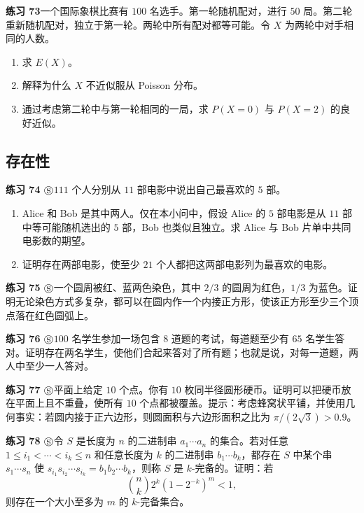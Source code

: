\documentclass[UTF8, 12pt, fontset=fandol, oneside]{ctexart}
\begin{document}
\noindent\textbf{练习 73}\quad 一个国际象棋比赛有 $100$ 名选手。第一轮随机配对，进行 $50$ 局。第二轮重新随机配对，独立于第一轮。两轮中所有配对都等可能。令 $X$ 为两轮中对手相同的人数。
\begin{enumerate}
  \item[(a)] 求 $E(X)$。
  \item[(b)] 解释为什么 $X$ 不近似服从 Poisson 分布。
  \item[(c)] 通过考虑第二轮中与第一轮相同的一局，求 $P(X=0)$ 与 $P(X=2)$ 的良好近似。
\end{enumerate}

\subsection*{存在性}

\noindent\textbf{练习 74 $\circledS$}\quad $111$ 个人分别从 $11$ 部电影中说出自己最喜欢的 $5$ 部。
\begin{enumerate}
  \item[(a)] Alice 和 Bob 是其中两人。仅在本小问中，假设 Alice 的 $5$ 部电影是从 $11$ 部中等可能随机选出的 $5$ 部，Bob 也类似且独立。求 Alice 与 Bob 片单中共同电影数的期望。
  \item[(b)] 证明存在两部电影，使至少 $21$ 个人都把这两部电影列为最喜欢的电影。
\end{enumerate}

\noindent\textbf{练习 75 $\circledS$}\quad 一个圆周被红、蓝两色染色，其中 $2/3$ 的圆周为红色，$1/3$ 为蓝色。证明无论染色方式多复杂，都可以在圆内作一个内接正方形，使该正方形至少三个顶点落在红色圆弧上。

\noindent\textbf{练习 76 $\circledS$}\quad $100$ 名学生参加一场包含 $8$ 道题的考试，每道题至少有 $65$ 名学生答对。证明存在两名学生，使他们合起来答对了所有题；也就是说，对每一道题，两人中至少一人答对。

\noindent\textbf{练习 77 $\circledS$}\quad 平面上给定 $10$ 个点。你有 $10$ 枚同半径圆形硬币。证明可以把硬币放在平面上且不重叠，使所有 $10$ 个点都被覆盖。提示：考虑蜂窝状平铺，并使用几何事实：若圆内接于正六边形，则圆面积与六边形面积之比为 $\pi/(2\sqrt3)>0.9$。

\noindent\textbf{练习 78 $\circledS$}\quad 令 $S$ 是长度为 $n$ 的二进制串 $a_1\cdots a_n$ 的集合。若对任意 $1\le i_1<\cdots<i_k\le n$ 和任意长度为 $k$ 的二进制串 $b_1\cdots b_k$，都存在 $S$ 中某个串 $s_1\cdots s_n$ 使 $s_{i_1}s_{i_2}\cdots s_{i_k}=b_1b_2\cdots b_k$，则称 $S$ 是 $k$-完备的。证明：若
\[
  \binom{n}{k}2^k(1-2^{-k})^m<1,
\]
则存在一个大小至多为 $m$ 的 $k$-完备集合。
\end{document}
